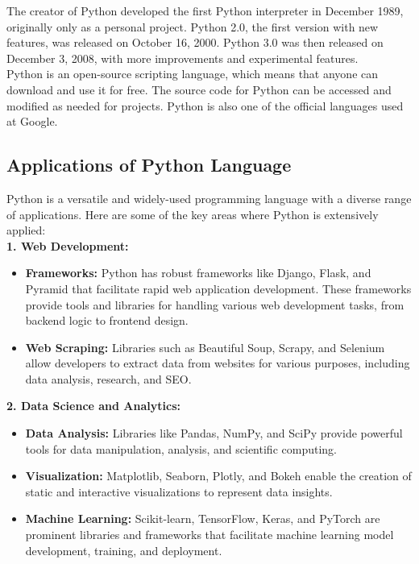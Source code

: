 \documentclass[12pt]{article}
\begin{document}
The creator of Python developed the first Python interpreter in December 1989, originally only as a personal project. Python 2.0, the first version with new features, was released on October 16, 2000. Python 3.0 was then released on December 3, 2008, with more improvements and experimental features.\\

Python is an open-source scripting language, which means that anyone can download and use it for free. The source code for Python can be accessed and modified as needed for projects. Python is also one of the official languages used at Google.


\subsection{Applications of Python Language}
Python is a versatile and widely-used programming language with a diverse range of applications. Here are some of the key areas where Python is extensively applied:\\

\textbf{1. Web Development:}
\begin{itemize}
    \item \textbf{Frameworks:} Python has robust frameworks like Django, Flask, and Pyramid that facilitate rapid web application development. These frameworks provide tools and libraries for handling various web development tasks, from backend logic to frontend design.
    \item \textbf{Web Scraping:} Libraries such as Beautiful Soup, Scrapy, and Selenium allow developers to extract data from websites for various purposes, including data analysis, research, and SEO.
\end{itemize}

\textbf{2. Data Science and Analytics:}
\begin{itemize}
    \item \textbf{Data Analysis:} Libraries like Pandas, NumPy, and SciPy provide powerful tools for data manipulation, analysis, and scientific computing.
    \item \textbf{Visualization:} Matplotlib, Seaborn, Plotly, and Bokeh enable the creation of static and interactive visualizations to represent data insights.
    \item \textbf{Machine Learning:} Scikit-learn, TensorFlow, Keras, and PyTorch are prominent libraries and frameworks that facilitate machine learning model development, training, and deployment.
\end{itemize}
\end{document}
